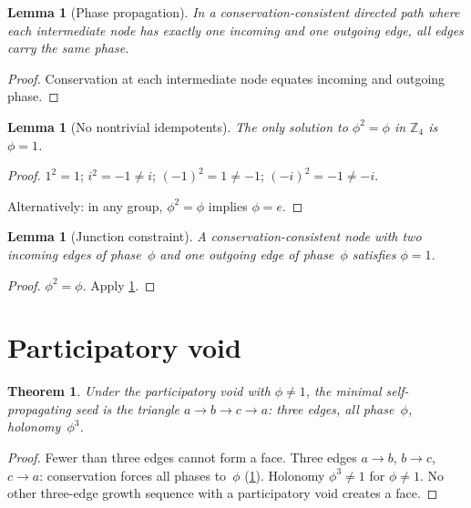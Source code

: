 \documentclass[11pt,a4paper]{article}
\theoremstyle{definition}
\theoremstyle{plain}
\newtheorem{theorem}[definition]{Theorem}
\newtheorem{lemma}[definition]{Lemma}
\theoremstyle{remark}
\newcommand{\Zf}{\mathbb{Z}_4}
\begin{document}
\begin{lemma}[Phase propagation]\label{lem:chain}
  In a conservation-consistent directed path where each intermediate node has exactly one incoming and one outgoing edge, all edges carry the same phase.
\end{lemma}

\begin{proof}
  Conservation at each intermediate node equates incoming and outgoing phase.
\end{proof}

\begin{lemma}[No nontrivial idempotents]\label{lem:idemp}
  The only solution to $\phi^2 = \phi$ in $\Zf$ is $\phi = 1$.
\end{lemma}

\begin{proof}
  $1^2 = 1$;\; $i^2 = -1 \neq i$;\; $(-1)^2 = 1 \neq -1$;\; $(-i)^2 = -1 \neq -i$.

  Alternatively: in any group, $\phi^2 = \phi$ implies $\phi = e$.
\end{proof}

\begin{lemma}[Junction constraint]\label{lem:junction}
  A conservation-consistent node with two incoming edges of phase~$\phi$ and one outgoing edge of phase~$\phi$ satisfies $\phi = 1$.
\end{lemma}

\begin{proof}
  $\phi^2 = \phi$.  Apply \cref{lem:idemp}.
\end{proof}

\section{Participatory void}\label{sec:targetable}

\begin{theorem}\label{thm:voidreturn}
  Under the participatory void with $\phi \neq 1$, the minimal self-propagating seed is the triangle $a \to b \to c \to a$: three edges, all phase~$\phi$, holonomy~$\phi^3$.
\end{theorem}

\begin{proof}
  Fewer than three edges cannot form a face.  Three edges $a \to b$, $b \to c$, $c \to a$: conservation forces all phases to~$\phi$ (\cref{lem:chain}).  Holonomy $\phi^3 \neq 1$ for $\phi \neq 1$.  No other three-edge growth sequence with a participatory void creates a face.
\end{proof}
\end{document}
